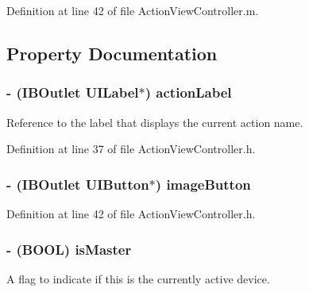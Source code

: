 Definition at line 42 of file ActionViewController.m.



\subsection{Property Documentation}
\hypertarget{interface_action_view_controller_a743f2a07e0d706cacdd54bd546cf0066}{
\subsubsection[{actionLabel}]{\setlength{\rightskip}{0pt plus 5cm}-\/ (IBOutlet UILabel$\ast$) actionLabel}}
\label{interface_action_view_controller_a743f2a07e0d706cacdd54bd546cf0066}
Reference to the label that displays the current action name. 

Definition at line 37 of file ActionViewController.h.

\hypertarget{interface_action_view_controller_af768033a4289ba93a603e190d298cb55}{
\subsubsection[{imageButton}]{\setlength{\rightskip}{0pt plus 5cm}-\/ (IBOutlet UIButton$\ast$) imageButton}}
\label{interface_action_view_controller_af768033a4289ba93a603e190d298cb55}


Definition at line 42 of file ActionViewController.h.

\hypertarget{interface_action_view_controller_abbe31ad947ac06e484e486dd2d47c541}{
\subsubsection[{isMaster}]{\setlength{\rightskip}{0pt plus 5cm}-\/ (BOOL) isMaster}}
\label{interface_action_view_controller_abbe31ad947ac06e484e486dd2d47c541}
A flag to indicate if this is the currently active device.

